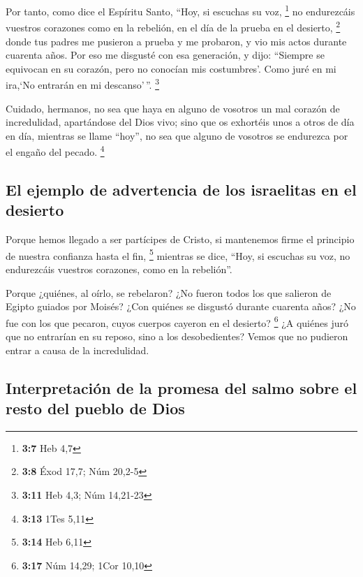  Por tanto, como dice el Espíritu Santo, ``Hoy, si
escuchas su voz, \footnote{\textbf{3:7} Heb 4,7}  no
endurezcáis vuestros corazones como en la rebelión, en el día de la
prueba en el desierto, \footnote{\textbf{3:8} Éxod 17,7; Núm 20,2-5}
 donde tus padres me pusieron a prueba y me probaron, y
vio mis actos durante cuarenta años.  Por eso me disgusté
con esa generación, y dijo: ``Siempre se equivocan en su corazón, pero
no conocían mis costumbres'.  Como juré en mi ira,`No
entrarán en mi descanso'\,''. \footnote{\textbf{3:11} Heb 4,3; Núm
  14,21-23}

 Cuidado, hermanos, no sea que haya en alguno de vosotros
un mal corazón de incredulidad, apartándose del Dios vivo;
 sino que os exhortéis unos a otros de día en día,
mientras se llame ``hoy'', no sea que alguno de vosotros se endurezca
por el engaño del pecado. \footnote{\textbf{3:13} 1Tes 5,11}

\hypertarget{el-ejemplo-de-advertencia-de-los-israelitas-en-el-desierto}{%
\subsection{El ejemplo de advertencia de los israelitas en el
desierto}\label{el-ejemplo-de-advertencia-de-los-israelitas-en-el-desierto}}

 Porque hemos llegado a ser partícipes de Cristo, si
mantenemos firme el principio de nuestra confianza hasta el fin,
\footnote{\textbf{3:14} Heb 6,11}  mientras se dice,
``Hoy, si escuchas su voz, no endurezcáis vuestros corazones, como en la
rebelión''.

 Porque ¿quiénes, al oírlo, se rebelaron? ¿No fueron
todos los que salieron de Egipto guiados por Moisés? 
¿Con quiénes se disgustó durante cuarenta años? ¿No fue con los que
pecaron, cuyos cuerpos cayeron en el desierto? \footnote{\textbf{3:17}
  Núm 14,29; 1Cor 10,10}  ¿A quiénes juró que no
entrarían en su reposo, sino a los desobedientes?  Vemos
que no pudieron entrar a causa de la incredulidad.

\hypertarget{interpretaciuxf3n-de-la-promesa-del-salmo-sobre-el-resto-del-pueblo-de-dios}{%
\subsection{Interpretación de la promesa del salmo sobre el resto del
pueblo de
Dios}\label{interpretaciuxf3n-de-la-promesa-del-salmo-sobre-el-resto-del-pueblo-de-dios}}

